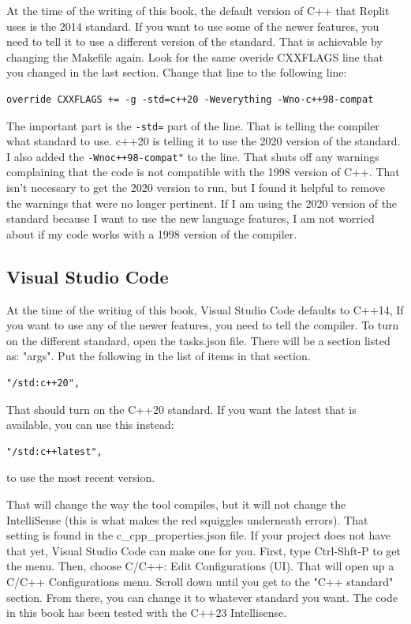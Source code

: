 At the time of the writing of this book, the default version of C++ that Replit uses is the 2014 standard. If you want to use some of the newer features, you need to tell it to use a different version of the standard. That is achievable by changing the Makefile again. Look for the same overide CXXFLAGS line that you changed in the last section. Change that line to the following line:

\begin{verbatim}
override CXXFLAGS += -g -std=c++20 -Weverything -Wno-c++98-compat
\end{verbatim}

The important part is the {\tt -std=} part of the line. That is telling the compiler what standard to use. c++20 is telling it to use the 2020 version of the standard. I also added the {\tt -Wnoc++98-compat"} to the line. That shuts off any warnings complaining that the code is not compatible with the 1998 version of C++. That isn't necessary to get the 2020 version to run, but I found it helpful to remove the warnings that were no longer pertinent. If I am using the 2020 version of the standard because I want to use the new language features, I am not worried about if my code works with a 1998 version of the compiler.

\subsection{Visual Studio Code}
At the time of the writing of this book, Visual Studio Code defaults to C++14, If you want to use any of the newer features, you need to tell
the compiler. To turn on the different standard, open the tasks.json file. There will be a section listed as: "args". Put the following in the list of items in that section.
\begin{verbatim}
"/std:c++20",    
\end{verbatim}
That should turn on the C++20 standard. If you want the latest that is
available, you can use this instead:
\begin{verbatim}
"/std:c++latest",
\end{verbatim}
to use the most recent version.

That will change the way the tool compiles, but it will not change the IntelliSense (this is what makes the red squiggles underneath errors). That setting is found in the c\_cpp\_properties.json file. If your project does not have that yet, Visual Studio Code can make one for you. First, type Ctrl-Shft-P to get the menu. Then, choose C/C++: Edit Configurations (UI). That will open up a C/C++ Configurations menu. Scroll down until you get to the "C++ standard" section. From there, you can change it to whatever standard you want. The code in this book has been tested with the C++23 Intellisense.

